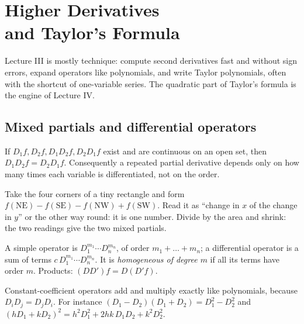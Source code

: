 \chapter[Higher Derivatives and Taylor]{Higher Derivatives\\ and Taylor's Formula}\label{ch:three}

\begin{examnote}
Lecture III is mostly technique: compute second derivatives fast and without sign errors,
expand operators like polynomials, and write Taylor polynomials, often with the shortcut of
one-variable series. The quadratic part of Taylor's formula is the engine of Lecture IV.
\end{examnote}

\section{Mixed partials and differential operators}

\begin{thm}[Schwarz]
If $D_1f,D_2f,D_1D_2f,D_2D_1f$ exist and are continuous on an open set, then
$D_1D_2f=D_2D_1f$. Consequently a repeated partial derivative depends only on how many times
each variable is differentiated, not on the order.
\end{thm}

\begin{intuition}
Take the four corners of a tiny rectangle and form $f(\text{NE})-f(\text{SE})-f(\text{NW})+f(\text{SW})$.
Read it as ``change in $x$ of the change in $y$'' or the other way round: it is one number.
Divide by the area and shrink: the two readings give the two mixed partials.
\end{intuition}

\begin{defi}
A simple operator is $D_1^{m_1}\cdots D_n^{m_n}$, of order $m_1+\dots+m_n$; a differential
operator is a sum of terms $c\,D_1^{m_1}\cdots D_n^{m_n}$. It is \emph{homogeneous of degree
$m$} if all its terms have order $m$. Products: $(DD')f=D(D'f)$.
\end{defi}

\begin{remember}
Constant-coefficient operators add and multiply exactly like polynomials, because
$D_iD_j=D_jD_i$. For instance $(D_1-D_2)(D_1+D_2)=D_1^2-D_2^2$ and
$(hD_1+kD_2)^2=h^2D_1^2+2hk\,D_1D_2+k^2D_2^2$.
\end{remember}

